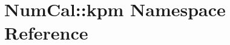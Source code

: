 \hypertarget{namespaceNumCal_1_1kpm}{\section{Num\+Cal\+:\+:kpm Namespace Reference}
\label{namespaceNumCal_1_1kpm}
}
